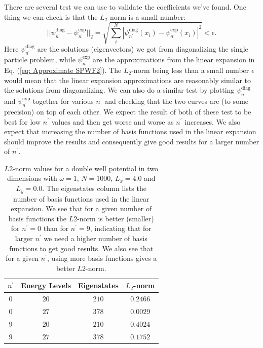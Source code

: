 \documentclass[../main.tex]{subfiles}
\begin{document}
There are several test we can use to validate the coefficients we've found. One thing we can check is that the $L_2$-norm is a small number:
\begin{equation}
    ||\psi_{n^\prime}^\textrm{diag}-\psi_{n^\prime}^\textrm{exp}||_2 = \sqrt{\sum_i^N |\psi_{n^\prime}^\textrm{diag}(x_i)-\psi_{n^\prime}^\textrm{exp}(x_i)|^2} < \epsilon.
\end{equation}
Here $\psi_{n^\prime}^\textrm{diag}$ are the solutions (eigenvectors) we got from diagonalizing the single particle problem, while $\psi_{n^\prime}^\textrm{exp}$ are the approximations from the linear expansion in Eq. (\ref{eq: Approximate SPWF2}). The $L_2$-norm being less than a small number $\epsilon$ would mean that the linear expansion approximations are reasonably similar to the solutions from diagonalizing. We can also do a similar test by plotting $\psi_{n^\prime}^\textrm{diag}$ and $\psi_{n^\prime}^\textrm{exp}$ together for various $n^\prime$ and checking that the two curves are (to some precision) on top of each other. We expect the result of both of these test to be best for low $n^\prime$ values and then get worse and worse as $n^\prime$ increases. We also expect that increasing the number of basis functions used in the linear expansion should improve the results and consequently give good results for a larger number of $n^\prime$.

\begin{table}[!ht]
  \centering
  \begin{tabular}{ | c | c | c | c | }
    \hline
    $n^\prime$ & Energy Levels & Eigenstates & $L_2$-norm\\*
    \hline
    $0$ & $20$ & $210$ & $0.2466$ %
    \\*
    \hline
    $0$ & $27$ & $378$ & $0.0029$ %
    \\*
    \hline
    $9$ & $20$ & $210$ & $0.4024$ %
    \\*
    \hline
    $9$ & $27$ & $378$ & $0.1752$ %
    \\*
    \hline
  \end{tabular}
  \caption{$L2$-norm values for a double well potential in two dimensions with $\omega = 1$, $N = 1000$, $L_x = 4.0$ and $L_y = 0.0$. The eigenstates column lists the number of basis functions used in the linear expansion. We see that for a given number of basis functions the $L2$-norm is better (smaller) for $n^\prime = 0$ than for $n^\prime = 9$, indicating that for larger $n^\prime$ we need a higher number of basis functions to get good results. We also see that for a given $n^\prime$, using more basis functions gives a better $L2$-norm.}
  \label{tab:L2-norm}
\end{table}
\end{document}
